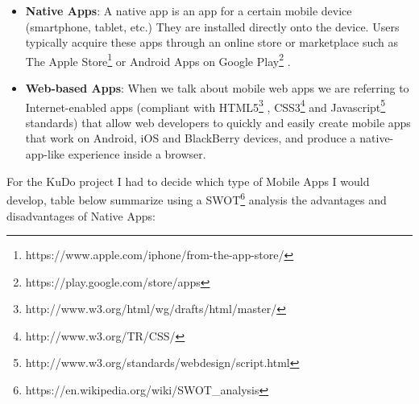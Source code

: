 \documentclass[a4paper,12pt]{book}
\begin{document}
\begin{itemize}
 \item \textbf{Native Apps}: A native app is an app for a certain mobile device (smartphone, tablet, etc.) They are installed directly onto the device. Users typically acquire these apps through an online store or marketplace such as The Apple Store\footnote{https://www.apple.com/iphone/from-the-app-store/} or Android Apps on Google Play\footnote{https://play.google.com/store/apps} .
 \item \textbf{Web-based Apps}: When we talk about mobile web apps we are referring to Internet-enabled apps (compliant with HTML5\footnote{http://www.w3.org/html/wg/drafts/html/master/} , CSS3\footnote{http://www.w3.org/TR/CSS/} and Javascript\footnote{http://www.w3.org/standards/webdesign/script.html}  standards) that allow web developers to quickly and easily create mobile apps that work on Android, iOS and BlackBerry devices, and produce a native-app-like experience inside a browser. 
\end{itemize}

For the KuDo project I had to decide which type of Mobile Apps I would develop, table below summarize using a SWOT\footnote{https://en.wikipedia.org/wiki/SWOT\_analysis} analysis the advantages and disadvantages of Native Apps:
\end{document}
